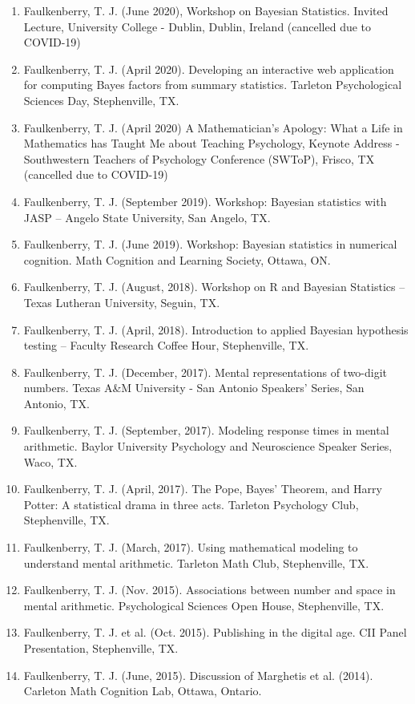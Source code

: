 \documentclass[article,10pt]{article}
\begin{document}
\begin{enumerate}
\item Faulkenberry, T. J. (June 2020), Workshop on Bayesian Statistics. Invited Lecture, University College - Dublin, Dublin, Ireland (cancelled due to COVID-19)
\item Faulkenberry, T. J. (April 2020). Developing an interactive web application for computing Bayes factors from summary statistics. Tarleton Psychological Sciences Day, Stephenville, TX.
\item Faulkenberry, T. J. (April 2020) A Mathematician's Apology: What a Life in Mathematics has Taught Me about Teaching Psychology,  Keynote Address - Southwestern Teachers of Psychology Conference (SWToP), Frisco, TX (cancelled due to COVID-19)
\item Faulkenberry, T. J. (September 2019). Workshop: Bayesian statistics with JASP -- Angelo State University, San Angelo, TX.
\item Faulkenberry, T. J. (June 2019). Workshop: Bayesian statistics in numerical cognition. Math Cognition and Learning Society, Ottawa, ON.
\item Faulkenberry, T. J. (August, 2018). Workshop on R and Bayesian Statistics -- Texas Lutheran University, Seguin, TX.
\item Faulkenberry, T. J. (April, 2018). Introduction to applied Bayesian hypothesis testing -- Faculty Research Coffee Hour, Stephenville, TX.
\item Faulkenberry, T. J. (December, 2017). Mental representations of two-digit numbers. Texas A\&M University - San Antonio Speakers' Series, San Antonio, TX.
\item Faulkenberry, T. J. (September, 2017). Modeling response times in mental arithmetic. Baylor University Psychology and Neuroscience Speaker Series, Waco, TX.
\item Faulkenberry, T. J. (April, 2017). The Pope, Bayes' Theorem, and Harry Potter: A statistical drama in three acts.  Tarleton Psychology Club, Stephenville, TX.
\item Faulkenberry, T. J. (March, 2017). Using mathematical modeling to understand mental arithmetic. Tarleton Math Club, Stephenville, TX.
\item Faulkenberry, T. J. (Nov. 2015). Associations between number and space in mental arithmetic.  Psychological Sciences Open House, Stephenville, TX.
\item Faulkenberry, T. J. et al. (Oct. 2015). Publishing in the digital age.  CII Panel Presentation, Stephenville, TX.
\item Faulkenberry, T. J. (June, 2015). Discussion of Marghetis et al. (2014). Carleton Math Cognition Lab, Ottawa, Ontario.

\end{enumerate}
\end{document}

